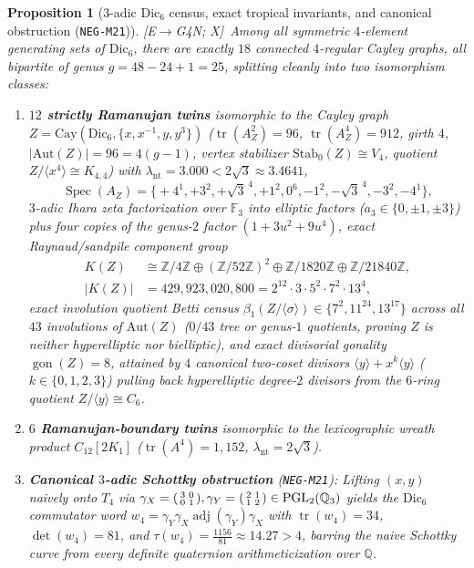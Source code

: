 \documentclass[11pt]{amsart}
\numberwithin{equation}{section}
\theoremstyle{plain}
\newtheorem{proposition}[theorem]{Proposition}
\theoremstyle{definition}\newtheorem{definition}[theorem]{Definition}
\theoremstyle{remark}\newtheorem{remark}[theorem]{Remark}
\newcommand{\Q}{\mathbb{Q}}
\newcommand{\Z}{\mathbb{Z}}
\newcommand{\F}{\mathbb{F}}
\newcommand{\PGL}{\mathrm{PGL}}
\newcommand{\Aut}{\mathrm{Aut}}
\newcommand{\Cay}{\mathrm{Cay}}
\newcommand{\ctag}[1]{\textup{\textsf{\scriptsize[#1]}}}
\begin{document}
\begin{proposition}[$3$-adic $\mathrm{Dic}_6$ census, exact tropical invariants, and canonical obstruction (\texttt{NEG-M21})]\label{prop:dic6}
\ctag{E$\to$G4N; X}\ Among all symmetric $4$-element generating sets of $\mathrm{Dic}_6$, there are exactly $18$ connected $4$-regular Cayley graphs, all bipartite of genus $g=48-24+1=25$, splitting cleanly into two isomorphism classes:
\begin{enumerate}[label=(\alph*),nosep]
\item \textbf{$12$ strictly Ramanujan twins} isomorphic to the Cayley graph $Z=\Cay(\mathrm{Dic}_6,\{x,x^{-1},y,y^3\})$ ($\operatorname{tr}(A_Z^2)=96$, $\operatorname{tr}(A_Z^4)=912$, girth $4$, $|\Aut(Z)|=96=4(g-1)$, vertex stabilizer $\mathrm{Stab}_0(Z)\cong V_4$, quotient $Z/\langle x^4\rangle\cong K_{4,4}$) with $\lambda_{\mathrm{nt}}=3.000<2\sqrt{3}\approx 3.4641$,
\[
\operatorname{Spec}(A_Z)=\bigl\{+4^1,+3^2,+\sqrt{3}^{\,4},+1^2,0^6,-1^2,-\sqrt{3}^{\,4},-3^2,-4^1\bigr\},
\]
$3$-adic Ihara zeta factorization over $\F_3$ into elliptic factors ($a_3\in\{0,\pm 1,\pm 3\}$) plus four copies of the genus-$2$ factor $(1+3u^2+9u^4)$, exact Raynaud/sandpile component group
\begin{align*}
K(Z) &\cong \Z/4\Z \oplus (\Z/52\Z)^2 \oplus \Z/1820\Z \oplus \Z/21840\Z, \\
|K(Z)| &= 429{,}923{,}020{,}800 = 2^{12}\cdot 3\cdot 5^2\cdot 7^2\cdot 13^4,
\end{align*}
exact involution quotient Betti census $\beta_1(Z/\langle\sigma\rangle)\in\{7^2,11^{24},13^{17}\}$ across all $43$ involutions of $\Aut(Z)$ ($0/43$ tree or genus-$1$ quotients, proving $Z$ is neither hyperelliptic nor bielliptic), and exact divisorial gonality $\operatorname{gon}(Z)=8$, attained by $4$ canonical two-coset divisors $\langle y\rangle+x^k\langle y\rangle$ ($k\in\{0,1,2,3\}$) pulling back hyperelliptic degree-$2$ divisors from the $6$-ring quotient $Z/\langle y\rangle\cong C_6$.
\item \textbf{$6$ Ramanujan-boundary twins} isomorphic to the lexicographic wreath product $C_{12}[2K_1]$ ($\operatorname{tr}(A^4)=1{,}152$, $\lambda_{\mathrm{nt}}=2\sqrt{3}$).
\item \textbf{Canonical $3$-adic Schottky obstruction} (\textup{\texttt{NEG-M21}}): Lifting $(x,y)$ naively onto $T_4$ via $\gamma_X=\begin{psmallmatrix}3 & 0 \\ 0 & 1\end{psmallmatrix}, \gamma_Y=\begin{psmallmatrix}2 & 1 \\ 1 & 2\end{psmallmatrix}\in\PGL_2(\Q_3)$ yields the $\mathrm{Dic}_6$ commutator word $w_4=\gamma_Y\gamma_X\operatorname{adj}(\gamma_Y)\gamma_X$ with $\operatorname{tr}(w_4)=34$, $\det(w_4)=81$, and $\tau(w_4)=\frac{1156}{81}\approx 14.27>4$, barring the naive Schottky curve from every definite quaternion arithmeticization over $\Q$.
\end{enumerate}
\end{proposition}
\end{document}
